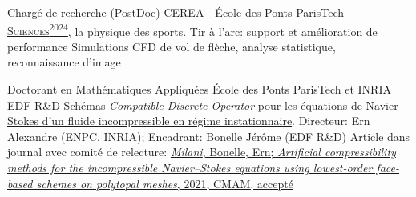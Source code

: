 \documentclass[french]{RMcv}
\begin{document}






%
%


%
        {Charg\'e de recherche (PostDoc)}%
        {CEREA - \'Ecole des Ponts ParisTech}%
        {\href{https://sciences2024.polytechnique.fr/}{\textsc{Sciences}\textsuperscript{2024}}, la physique des sports. Tir \`a l'arc: support et amélioration de performance}%
        {Simulations CFD de vol de flèche, analyse statistique, reconnaissance d'image}

%
        {Doctorant en Math\'ematiques Appliqu\'ees}%
        {\'Ecole des Ponts ParisTech et INRIA EDF R\&D}%
        {\href{https://tel.archives-ouvertes.fr/tel-03080530}{Sch\'emas \emph{Compatible Discrete Operator} pour les \'equations de Navier–Stokes d’un fluide incompressible en r\'egime instationnaire}. Directeur: Ern Alexandre (ENPC, INRIA); Encadrant: Bonelle J\'er\^ome (EDF R\&D)}%
        {Article dans journal avec comité de relecture: \href{https://www.degruyter.com/document/doi/10.1515/cmam-2021-0089/html}{\emph{Milani}, Bonelle, Ern; \emph{Artificial compressibility methods for the incompressible Navier--Stokes equations using lowest-order face-based schemes on polytopal meshes}, 2021, CMAM, accepté}}
\end{document}
